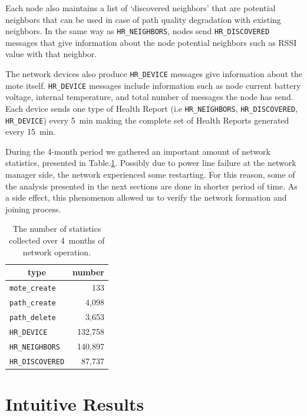 \documentclass{sig-alternate}
\newcommand{\HRNEIGHBORS}    {{\tt HR\_NEIGHBORS}\xspace}
\newcommand{\HRDISCOVERED}   {{\tt HR\_DISCOVERED}\xspace}
\newcommand{\HRDEVICE}       {{\tt HR\_DEVICE}\xspace}
\newcommand{\pathcreate}     {{\tt path\_create}\xspace}
\newcommand{\pathdelete}     {{\tt path\_delete}\xspace}
\newcommand{\motecreate}     {{\tt mote\_create}\xspace}
\newcommand{\HRNEIGHBORSTOTALNUMBER}     {140,897}
\begin{document}

Each node also maintains a list of `discovered neighbors' that are potential neighbors that can be used in case of path quality degradation with existing neighbors.
In the same way as \HRNEIGHBORS, nodes send \HRDISCOVERED messages that give information about the node potential neighbors such as RSSI value with that neighbor.


The network devices also produce \HRDEVICE messages give information about the mote itself.
\HRDEVICE messages include information such as node current battery voltage, internal temperature, and total number of messages the node has send.
Each device sends one type of Health Report (i.e \HRNEIGHBORS, \HRDISCOVERED, \HRDEVICE) every 5~min making the complete set of Health Reports generated every 15~min.


During the 4-month period we gathered an important amount of network statistics, presented in Table.\ref{tab:msg_stats}.
Possibly due to power line failure at the network manager side, the network experienced some restarting.
For this reason, some of the analysis presented in the next sections are done in shorter period of time.
As a side effect, this phenomenon allowed us to verify the network formation and joining process.

\begin{table}
    \centering
    \begin{tabular}{|l|r|}
        \hline
        \multicolumn{1}{|c|}{type} & \multicolumn{1}{|c|}{number} \\ \hline
        \hline
        \motecreate     &     133 \\ \hline
        \pathcreate     &   4,098 \\ \hline
        \pathdelete     &   3,653 \\ \hline
        \HRDEVICE       & 132,758 \\ \hline
        \HRNEIGHBORS    & \HRNEIGHBORSTOTALNUMBER \\ \hline
        \HRDISCOVERED   &  87,737 \\ \hline
    \end{tabular}
    \caption{The number of statistics collected over 4~months of network operation.}
    \label{tab:msg_stats}
\end{table}

\section{Intuitive Results}
\label{sec:intuitive}
\end{document}
